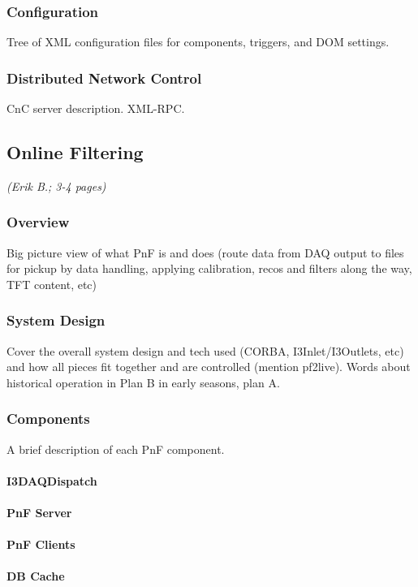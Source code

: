 \subsubsection{Configuration}

Tree of XML configuration files for components, triggers, and DOM settings.  

\subsubsection{Distributed Network Control}

CnC server description.  XML-RPC.  %

\subsection{Online Filtering}
\textsl{(Erik B.; 3-4 pages)}
\subsubsection{Overview}
Big picture view of what PnF is and does (route data from DAQ output to
files for pickup by data handling, applying calibration, recos and
filters along the way, TFT content, etc)

\subsubsection{System Design}
Cover the overall system design and tech used (CORBA, I3Inlet/I3Outlets,
etc) and how all pieces fit together and are controlled (mention
pf2live). Words about historical operation in Plan B in early seasons,
plan A.

\subsubsection{Components}
A brief description of each PnF component.
\paragraph{I3DAQDispatch}
\paragraph{PnF Server}
\paragraph{PnF Clients}
\paragraph{DB Cache}
